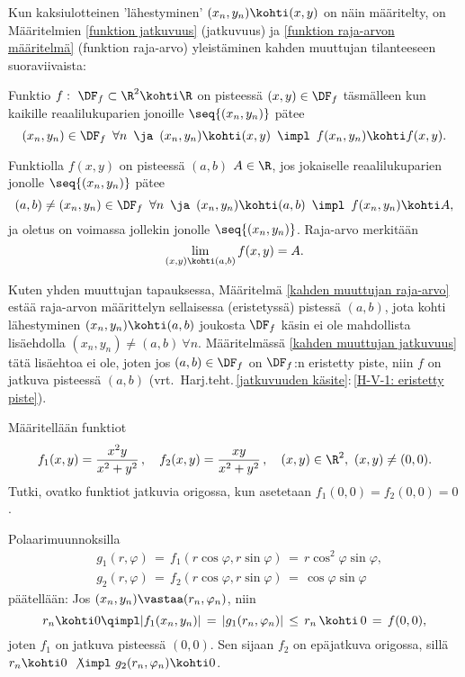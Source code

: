 Kun kaksiulotteinen 'lähestyminen' $(x_n,y_n)\kohti(x,y)$ on näin määritelty, on
Määritelmien \ref{funktion jatkuvuus} (jatkuvuus) ja \ref{funktion raja-arvon määritelmä}
(funktion raja-arvo) yleistäminen kahden muuttujan tilanteeseen suoraviivaista:
\begin{Def} \label{kahden muuttujan jatkuvuus} 
Funktio $f:\ \DF_f\subset\R^2\kohti\R$ on
 pisteessä $(x,y)\in\DF_f$ täsmälleen kun kaikille reaalilukuparien jonoille
$\seq{(x_n,y_n)}$ pätee
\[
(x_n,y_n)\in\DF_f\,\ \forall n\,\ \ja\,\ (x_n,y_n)\kohti(x,y)\,\ 
                                  \impl\,\ f(x_n,y_n) \kohti f(x,y).
\]
\end{Def}
\begin{Def} \label{kahden muuttujan raja-arvo}
Funktiolla $f(x,y)$ on pisteessä $(a,b)$
 $A\in\R$, jos jokaiselle reaalilukuparien jonolle $\seq{(x_n,y_n)}$ pätee
\[
(a,b)\neq(x_n,y_n)\in\DF_f\,\ \forall n\,\ \ja\,\ (x_n,y_n) \kohti (a,b)\,\ 
                                             \impl\,\ f(x_n,y_n) \kohti A, 
\]
ja oletus on voimassa jollekin jonolle $\seq{(x_n,y_n)}$. Raja-arvo merkitään
\[
\lim_{(x,y)\kohti(a,b)}f(x,y)=A.
\]
\end{Def}
Kuten yhden muuttujan tapauksessa, Määritelmä \ref{kahden muuttujan raja-arvo} estää raja-arvon
määrittelyn sellaisessa (eristetyssä) pistessä $(a,b)$, jota kohti lähestyminen
$(x_n,y_n)\kohti(a,b)$ joukosta $\DF_f$ käsin ei ole mahdollista lisäehdolla
$(x_n,y_n)\neq(a,b)\ \forall n$. Määritelmässä \ref{kahden muuttujan jatkuvuus} tätä lisäehtoa
ei ole, joten jos $(a,b)\in\DF_f$ on $\DF_f$:n eristetty piste, niin $f$ on jatkuva pisteessä
$(a,b)$ (vrt.\ Harj.teht.\,\ref{jatkuvuuden käsite}:\,\ref{H-V-1: eristetty piste}).
\begin{Exa} \label{udif-1: esim 1} Määritellään funktiot
\[
f_1(x,y)=\frac{x^2y}{x^2+y^2}\,, \quad
f_2(x,y)=\frac{xy}{x^2+y^2}\,, \quad (x,y)\in\R^2,\ (x,y)\neq(0,0).
\]
Tutki, ovatko funktiot jatkuvia origossa, kun asetetaan $f_1(0,0)=f_2(0,0)=0$.
\end{Exa}
\ratk Polaarimuunnoksilla
\begin{align*}
&g_1(r,\varphi) \,=\, f_1(r\cos\varphi,r\sin\varphi) \,=\, r\cos^2\varphi\sin\varphi, \\
&g_2(r,\varphi) \,=\, f_2(r\cos\varphi,r\sin\varphi) \,=\, \cos\varphi\sin\varphi
\end{align*}
päätellään: Jos $(x_n,y_n) \vastaa (r_n,\varphi_n)$, niin
\[
r_n \kohti 0 \qimpl |f_1(x_n,y_n)| \,=\, |g_1(r_n,\varphi_n)|
                                   \,\le\, r_n \,\kohti\, 0 \,=\, f(0,0),
\]
joten $f_1$ on jatkuva pisteessä $(0,0)$. Sen sijaan $f_2$ on epäjatkuva origossa, sillä
$r_n \kohti 0\ \not\impl\ g_2(r_n,\varphi_n) \kohti 0$.  \loppu


